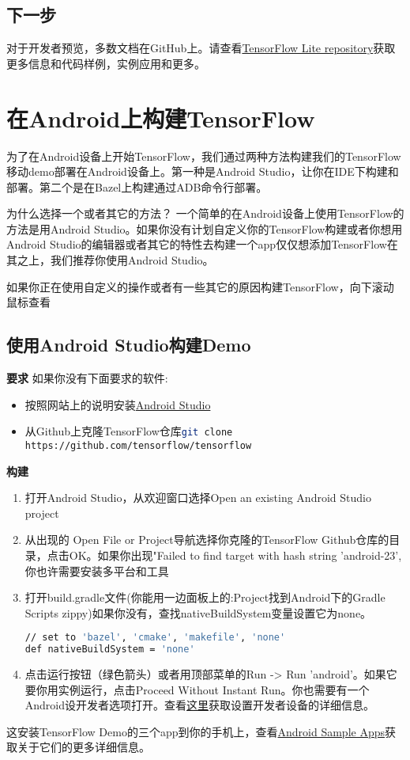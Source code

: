 \subsection{下一步}
对于开发者预览，多数文档在GitHub上。请查看\href{https://github.com/tensorflow/tensorflow/tree/master/tensorflow/contrib/lite}{TensorFlow Lite repository}获取更多信息和代码样例，实例应用和更多。

\section{在Android上构建TensorFlow}
为了在Android设备上开始TensorFlow，我们通过两种方法构建我们的TensorFlow移动demo部署在Android设备上。第一种是Android Studio，让你在IDE下构建和部署。第二个是在Bazel上构建通过ADB命令行部署。

为什么选择一个或者其它的方法？
一个简单的在Android设备上使用TensorFlow的方法是用Android Studio。如果你没有计划自定义你的TensorFlow构建或者你想用Android Studio的编辑器或者其它的特性去构建一个app仅仅想添加TensorFlow在其之上，我们推荐你使用Android Studio。

如果你正在使用自定义的操作或者有一些其它的原因构建TensorFlow，向下滚动鼠标查看
\subsection{使用Android Studio构建Demo}
\textbf{要求}\newline
如果你没有下面要求的软件:
\begin{itemize}
\item 按照网站上的说明安装\href{https://developer.android.com/studio/index.html?hl=zh-cn}{Android Studio}
\item 从Github上克隆TensorFlow仓库\lstinline[language=Bash]{git clone https://github.com/tensorflow/tensorflow}
\end{itemize}
\textbf{构建}\newline
\begin{enumerate}
\item 打开Android Studio，从欢迎窗口选择Open an existing Android Studio project
\item 从出现的 Open File or Project导航选择你克隆的TensorFlow Github仓库的目录，点击OK。如果你出现"Failed to find target with hash string 'android-23',你也许需要安装多平台和工具
\item 打开build.gradle文件(你能用一边面板上的:Project找到Android下的Gradle Scripts zippy)如果你没有，查找nativeBuildSystem变量设置它为none。
\begin{lstlisting}[language=Bash]
// set to 'bazel', 'cmake', 'makefile', 'none'
def nativeBuildSystem = 'none'

\end{lstlisting}
\item 点击运行按钮（绿色箭头）或者用顶部菜单的Run -> Run 'android'。如果它要你用实例运行，点击Proceed Without Instant Run。你也需要有一个Android设开发者选项打开。查看\href{https://developer.android.com/studio/run/device.html?hl=zh-cn}{这里}获取设置开发者设备的详细信息。
\end{enumerate}
这安装TensorFlow Demo的三个app到你的手机上，查看\href{https://www.tensorflow.org/mobile/android_build?hl=zh-cn#android_sample_apps}{Android Sample Apps}获取关于它们的更多详细信息。
